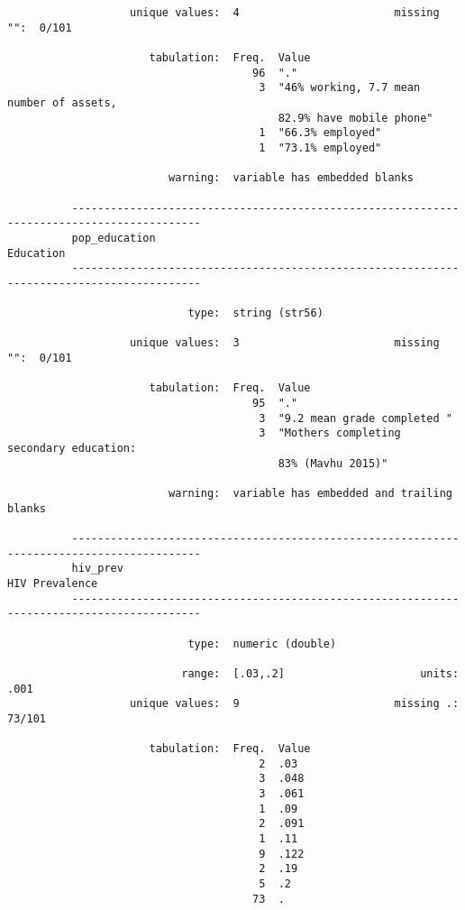 \documentclass{article}
\begin{document}
\begin{verbatim}
                   unique values:  4                        missing "":  0/101
          
                      tabulation:  Freq.  Value
                                      96  "."
                                       3  "46% working, 7.7 mean number of assets,
                                          82.9% have mobile phone"
                                       1  "66.3% employed"
                                       1  "73.1% employed"
          
                         warning:  variable has embedded blanks
          
          ------------------------------------------------------------------------------------------
          pop_education                                                                    Education
          ------------------------------------------------------------------------------------------
          
                            type:  string (str56)
          
                   unique values:  3                        missing "":  0/101
          
                      tabulation:  Freq.  Value
                                      95  "."
                                       3  "9.2 mean grade completed "
                                       3  "Mothers completing secondary education:
                                          83% (Mavhu 2015)"
          
                         warning:  variable has embedded and trailing blanks
          
          ------------------------------------------------------------------------------------------
          hiv_prev                                                                    HIV Prevalence
          ------------------------------------------------------------------------------------------
          
                            type:  numeric (double)
          
                           range:  [.03,.2]                     units:  .001
                   unique values:  9                        missing .:  73/101
          
                      tabulation:  Freq.  Value
                                       2  .03
                                       3  .048
                                       3  .061
                                       1  .09
                                       2  .091
                                       1  .11
                                       9  .122
                                       2  .19
                                       5  .2
                                      73  .
          

\end{verbatim}
\end{document}
